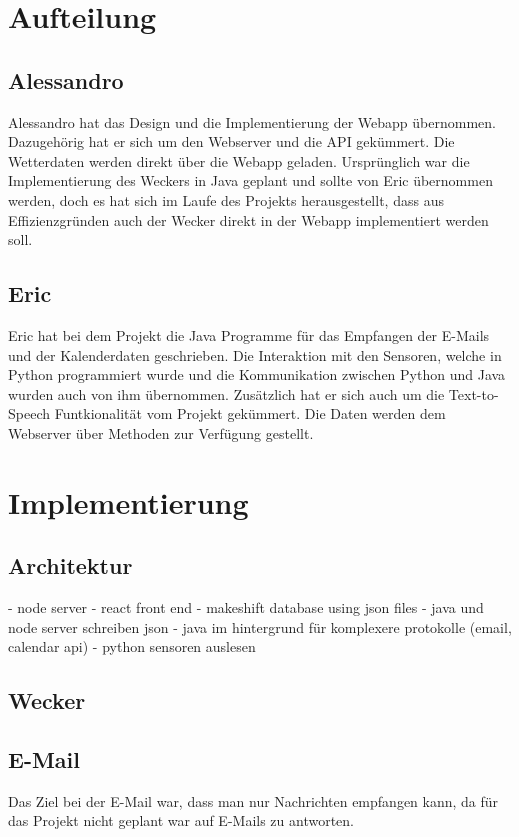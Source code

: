 \documentclass[11pt,a4paper]{article}
\begin{document}
\section{Aufteilung}
\subsection{Alessandro}
Alessandro hat das Design und die Implementierung der Webapp übernommen. Dazugehörig hat er sich um den Webserver und die API gekümmert. Die Wetterdaten werden direkt über die Webapp geladen. Ursprünglich war die Implementierung des Weckers in Java geplant und sollte von Eric übernommen werden, doch es hat sich im Laufe des Projekts herausgestellt, dass aus Effizienzgründen auch der Wecker direkt in der Webapp implementiert werden soll.

\subsection{Eric}
Eric hat bei dem Projekt die Java Programme für das Empfangen der E-Mails und der Kalenderdaten geschrieben. Die Interaktion mit den Sensoren, welche in Python programmiert wurde und die Kommunikation zwischen Python und Java wurden auch von ihm \"ubernommen. Zusätzlich hat er sich auch um die Text-to-Speech Funtkionalit\"at vom Projekt gek\"ummert. Die Daten werden dem Webserver über Methoden zur Verfügung gestellt.

\section{Implementierung}
\subsection{Architektur} %
- node server
- react front end
- makeshift database using json files
- java und node server schreiben json
- java im hintergrund für komplexere protokolle (email, calendar api)
- python sensoren auslesen

\subsection{Wecker}

\subsection{E-Mail}
Das Ziel bei der E-Mail war, dass man nur Nachrichten empfangen kann, da f\"ur das Projekt nicht geplant war auf E-Mails zu antworten.
\end{document}
